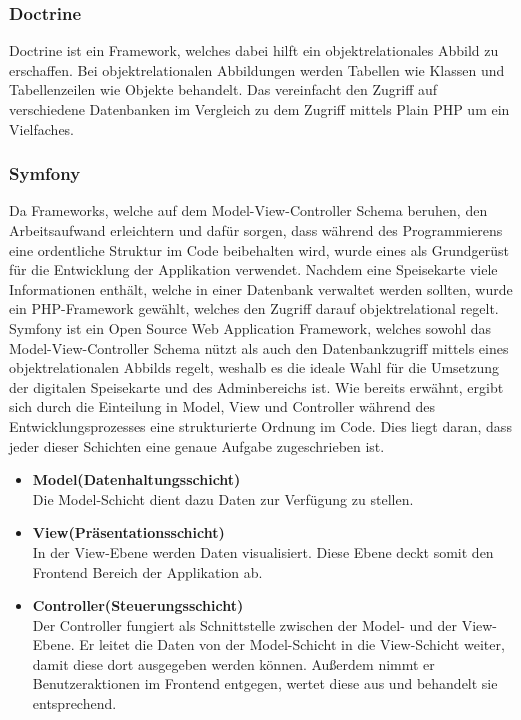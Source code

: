     \subsubsection{Doctrine}

{Doctrine\cite{doctrine}} ist ein Framework, welches dabei hilft ein objektrelationales Abbild zu erschaffen. Bei objektrelationalen Abbildungen werden Tabellen wie Klassen und Tabellenzeilen wie Objekte behandelt. Das vereinfacht den Zugriff auf verschiedene Datenbanken im Vergleich zu dem Zugriff mittels Plain PHP um ein Vielfaches.

    \subsubsection{Symfony}

Da Frameworks, welche auf dem Model-View-Controller Schema beruhen, den Arbeitsaufwand erleichtern und dafür sorgen, dass während des Programmierens eine ordentliche Struktur im Code beibehalten wird, wurde eines als Grundgerüst für die Entwicklung der Applikation verwendet. Nachdem eine Speisekarte viele Informationen enthält, welche in einer Datenbank verwaltet werden sollten, wurde ein PHP-Framework gewählt, welches den Zugriff darauf objektrelational regelt.
{Symfony\cite{symfony}} ist ein Open Source Web Application Framework, welches sowohl das Model-View-Controller Schema nützt als auch den Datenbankzugriff mittels eines objektrelationalen Abbilds regelt, weshalb es die ideale Wahl für die Umsetzung der digitalen Speisekarte und des Adminbereichs ist.
Wie bereits erwähnt, ergibt sich durch die Einteilung in Model, View und Controller während des Entwicklungsprozesses eine strukturierte Ordnung im Code.
Dies liegt daran, dass jeder dieser Schichten eine genaue Aufgabe zugeschrieben ist.
\begin{itemize}
    \item \textbf{Model(Datenhaltungsschicht)}\\
Die Model-Schicht dient dazu Daten zur Verfügung zu stellen.
    \item \textbf{View(Präsentationsschicht)}\\
In der View-Ebene werden Daten visualisiert. Diese Ebene deckt somit den Frontend Bereich der Applikation ab.
    \item \textbf{Controller(Steuerungsschicht)}\\
Der Controller fungiert als Schnittstelle zwischen der Model- und der View-Ebene. Er leitet die Daten von der Model-Schicht in die View-Schicht weiter, damit diese dort ausgegeben werden können. Außerdem nimmt er Benutzeraktionen im Frontend entgegen, wertet diese aus und behandelt sie entsprechend.
  \end{itemize}
